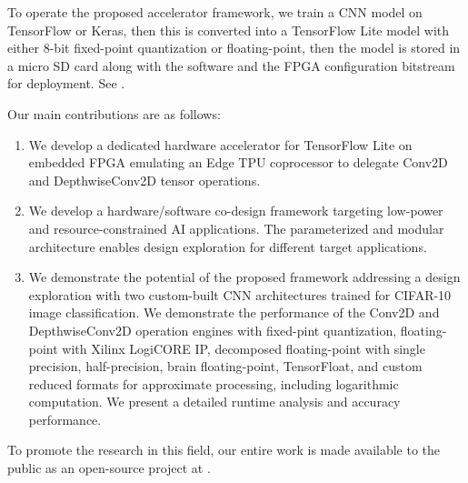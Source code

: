 To operate the proposed accelerator framework, we train a CNN model on TensorFlow or Keras, then this is converted into a TensorFlow Lite model with either 8-bit fixed-point quantization or floating-point, then the model is stored in a micro SD card along with the software and the FPGA configuration bitstream for deployment. See .

Our main contributions are as follows:
\begin{enumerate}
	\item We develop a dedicated hardware accelerator for TensorFlow Lite on embedded FPGA emulating an Edge TPU coprocessor to delegate Conv2D and DepthwiseConv2D tensor operations.
	\item We develop a hardware/software co-design framework targeting low-power and resource-constrained AI applications. The parameterized and modular architecture enables design exploration for different target applications.
	\item We demonstrate the potential of the proposed framework addressing a design exploration with two custom-built CNN architectures trained for CIFAR-10 image classification. We demonstrate the performance of the Conv2D and DepthwiseConv2D operation engines with fixed-pint quantization, floating-point with Xilinx LogiCORE IP, decomposed floating-point with single precision, half-precision, brain floating-point, TensorFloat, and custom reduced formats for approximate processing, including logarithmic computation. We present a detailed runtime analysis and accuracy performance.
\end{enumerate}

To promote the research in this field, our entire work is made available to the public as an open-source project at .